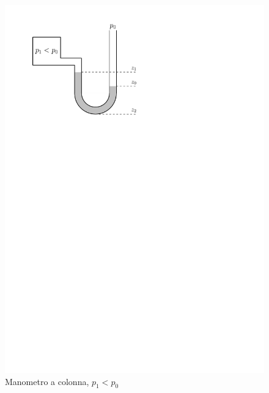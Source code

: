 	\begin{figure}[ht]
		\includegraphics[scale=0.80]{./2.3 Manometri/2.3-2}
		\centering
		\caption{Manometro a colonna, $p_1 < p_0$}
	\end{figure}
	
